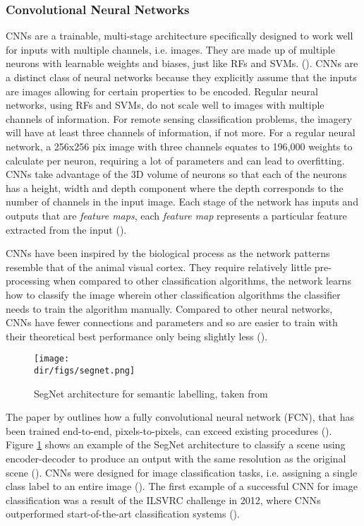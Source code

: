 \subsubsection{Convolutional Neural Networks}
CNNs are a trainable, multi-stage architecture specifically designed to work well for inputs with multiple channels, i.e. images. They are made up of multiple neurons with learnable weights and biases, just like RFs and SVMs.  (\cite{Karpathy1}). CNNs are a distinct class of neural networks because they explicitly assume that the inputs are images allowing for certain properties to be encoded. Regular neural networks, using RFs and SVMs, do not scale well to images with multiple channels of information. For remote sensing classification problems, the imagery will have at least three channels of information, if not more. For a regular neural network, a 256x256 pix image with three channels equates to 196,000 weights to calculate per neuron, requiring a lot of parameters and can lead to overfitting. CNNs take advantage of the 3D volume of neurons so that each of the neurons has a height, width and depth component where the depth corresponds to the number of channels in the input image. Each stage of the network has inputs and outputs that are \textit{feature maps}, each \textit{feature map} represents a particular feature extracted from the input (\cite{lecun10}).
\par
CNNs have been inspired by the biological process as the network patterns resemble that of the animal visual cortex. They require relatively little pre-processing when compared to other classification algorithms, the network learns how to classify the image wherein other classification algorithms the classifier needs to train the algorithm manually. Compared to other neural networks, CNNs have fewer connections and parameters and so are easier to train with their theoretical best performance only being slightly less (\cite{krizhevsky17}). 

\begin{figure}[htpb]
    \centering
    \texttt{[image: \\dir/figs/segnet.png]}
    \caption{SegNet architecture for semantic labelling, taken from \cite{audebert18}}
    \label{fig.segnet}
\end{figure}
The paper by \cite{long15} outlines how a fully convolutional neural network (FCN), that has been trained end-to-end, pixels-to-pixels, can exceed existing procedures (\cite{shelhamer17}). Figure \ref{fig.segnet} shows an example of the SegNet architecture to classify a scene using encoder-decoder to produce an output with the same resolution as the original scene (\cite{audebert18}). CNNs were designed for image classification tasks, i.e. assigning a single class label to an entire image (\cite{volpi17}). The first example of a successful CNN for image classification was a result of the ILSVRC challenge in 2012, where CNNs outperformed start-of-the-art classification systems (\cite{marmanis16,volpi17,krizhevsky17}). 
